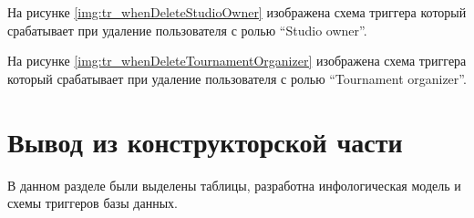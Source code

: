 На рисунке \ref{img:tr_whenDeleteStudioOwner} изображена схема триггера который срабатывает при удаление пользователя с ролью \textquotedblleft Studio owner\textquotedblright.


На рисунке \ref{img:tr_whenDeleteTournamentOrganizer} изображена схема триггера который срабатывает при удаление пользователя с ролью \textquotedblleft Tournament organizer\textquotedblright.


\section*{Вывод из конструкторской части}
В данном разделе были выделены таблицы, разработна инфологическая модель и  схемы триггеров базы данных.